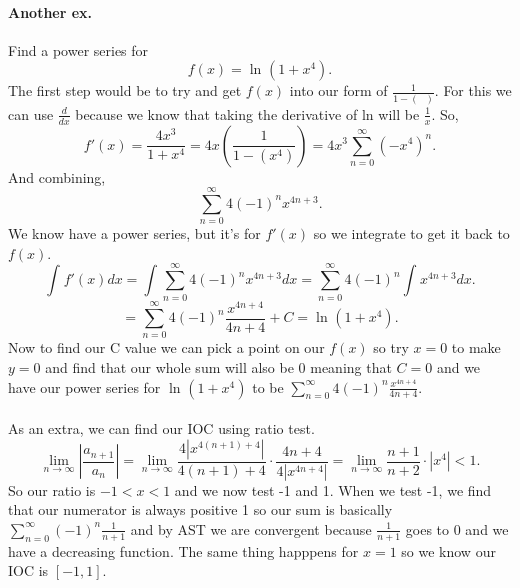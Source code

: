 \documentclass[a4paper]{article}
\begin{document}
\paragraph{Another ex.}
Find a power series for 
\[
f\left( x \right) = \ln^{  } \left( 1+x^{ 4 } \right) 
.\] 
The first step would be to try and get $ f\left( x \right)  $ into our form of $ \frac{ 1 }{ 1- \left( \text{  } \right)  }  $.  For this we can use $ \frac{ d }{ dx }  $ because we know that taking the derivative of ln will be $ \frac{ 1 }{ x }  $. So,
\[
f'\left( x \right) = \frac{ 4x^3 }{ 1+x^{ 4 } } = 4x\left( \frac{ 1 }{ 1-\left( x^{ 4 } \right)  }  \right) = 4x^3\sum_{ n=0 } ^{ \infty } \left( -x^{ 4 } \right) ^{ n }
.\] 
And combining,
\[
\sum_{ n=0 } ^{ \infty } 4\left( -1 \right) ^{ n }x^{ 4n+3 }
.\] 
We know have a power series, but it's for $ f'\left( x \right)  $ so we integrate to get it back to $ f\left( x \right)  $. 
\[
\int_{  }^{  } f'\left( x \right) dx = \int_{  }^{  } \sum_{ n=0 } ^{ \infty } 4\left( -1 \right) ^{ n }x^{ 4n+3 }dx= \sum_{ n=0 } ^{ \infty } 4\left( -1 \right) ^{ n }\int_{  }^{  } x^{ 4n+3 }dx
.\] 
\[
=\sum_{ n=0 } ^{ \infty } 4\left( -1 \right) ^{ n }\frac{ x^{ 4n+4 } }{ 4n+4 }+C= \ln^{  } \left( 1+x^{ 4 } \right) 
.\] 
Now to find our C value we can pick a point on our $ f\left( x \right)  $ so try $ x=0 $ to make $ y=0 $ and find that our whole sum will also be 0 meaning that $ C=0 $ and we have our power series for $ \ln^{  } \left( 1+x^{ 4 } \right)  $ to be $ \sum_{ n=0 } ^{ \infty } 4\left( -1 \right) ^{ n } \frac{ x^{ 4n+4 } }{ 4n+4 } $. \\ \\
As an extra, we can find our IOC using ratio test.
\[
\lim_{ n \to \infty} \left| \frac{ a_{ n+1 } }{ a_n } \right| = \lim_{ n \to \infty} \frac{ 4 \left|  x^{ 4\left( n+1 \right) +4 } \right|}{ 4\left( n+1 \right) +4 }\cdot \frac{ 4n+4 }{ 4 \left| x^{ 4n+4 } \right| } = \lim_{ n \to \infty} \frac{ n+1 }{ n+2 }\cdot \left| x^{ 4 } \right|<1
.\] 
So our ratio is $ -1<x<1 $ and we now test -1 and 1. When we test -1, we find that our numerator is always positive 1 so our sum is basically $ \sum_{ n=0 } ^{ \infty } \left( -1 \right) ^{ n }\frac{ 1 }{ n+1 }  $ and by AST we are convergent because $ \frac{ 1 }{ n+1 }  $ goes to 0 and we have a decreasing function. The same thing happpens for $ x=1 $ so we know our IOC is $ \left[ -1,1 \right]  $. 
\end{document}
